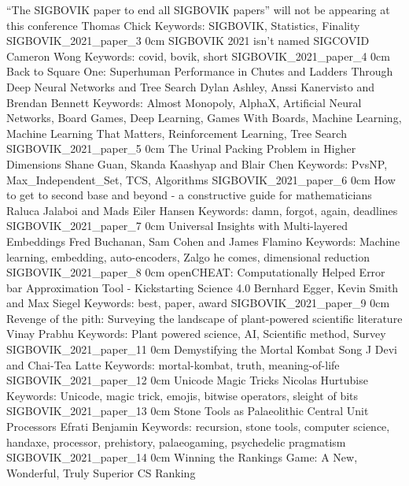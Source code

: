 \addpaper
	{``The SIGBOVIK paper to end all SIGBOVIK papers'' will not be appearing at this conference}
	{Thomas Chick}
	{Keywords: SIGBOVIK, Statistics, Finality}
	{SIGBOVIK_2021_paper_3}
	{0cm}
	{}
\addpaper
	{SIGBOVIK 2021 isn't named SIGCOVID}
	{Cameron Wong}
	{Keywords: covid, bovik, short}
	{SIGBOVIK_2021_paper_4}
	{0cm}
	{}
\addpaper
	{Back to Square One: Superhuman Performance in Chutes and Ladders Through Deep Neural Networks and Tree Search}
	{Dylan Ashley, Anssi Kanervisto and Brendan Bennett}
	{Keywords: Almost Monopoly, AlphaX, Artificial Neural Networks, Board Games, Deep Learning, Games With Boards, Machine Learning, Machine Learning That Matters, Reinforcement Learning, Tree Search}
	{SIGBOVIK_2021_paper_5}
	{0cm}
	{}
\addpaper
	{The Urinal Packing Problem in Higher Dimensions}
	{Shane Guan, Skanda Kaashyap and Blair Chen}
	{Keywords: PvsNP, Max\_Independent\_Set, TCS, Algorithms}
	{SIGBOVIK_2021_paper_6}
	{0cm}
	{}
\addpaper
	{How to get to second base and beyond - a constructive guide for mathematicians}
	{Raluca Jalaboi and Mads Eiler Hansen}
	{Keywords: damn, forgot, again, deadlines}
	{SIGBOVIK_2021_paper_7}
	{0cm}
	{}
\addpaper
	{Universal Insights with Multi-layered Embeddings}
	{Fred Buchanan, Sam Cohen and James Flamino}
	{Keywords: Machine learning, embedding, auto-encoders, Zalgo he comes, dimensional reduction}
	{SIGBOVIK_2021_paper_8}
	{0cm}
	{}
\addpaper
	{openCHEAT: Computationally Helped Error bar Approximation Tool - Kickstarting Science 4.0}
	{Bernhard Egger, Kevin Smith and Max Siegel}
	{Keywords: best, paper, award}
	{SIGBOVIK_2021_paper_9}
	{0cm}
	{}
\addpaper
	{Revenge of the pith: Surveying the landscape of plant-powered scientific literature}
	{Vinay Prabhu}
	{Keywords: Plant powered science, AI, Scientific method, Survey}
	{SIGBOVIK_2021_paper_11}
	{0cm}
	{}
\addpaper
	{Demystifying the Mortal Kombat Song}
	{J Devi and Chai-Tea Latte}
	{Keywords: mortal-kombat, truth, meaning-of-life}
	{SIGBOVIK_2021_paper_12}
	{0cm}
	{}
\addpaper
	{Unicode Magic Tricks}
	{Nicolas Hurtubise}
	{Keywords: Unicode, magic trick, emojis, bitwise operators, sleight of bits}
	{SIGBOVIK_2021_paper_13}
	{0cm}
	{}
\addpaper
	{Stone Tools as Palaeolithic Central Unit Processors}
	{Efrati Benjamin}
	{Keywords: recursion, stone tools, computer science, handaxe, processor, prehistory, palaeogaming, psychedelic pragmatism}
	{SIGBOVIK_2021_paper_14}
	{0cm}
	{}
\addpaper
	{Winning the Rankings Game: A New, Wonderful, Truly Superior CS Ranking}
